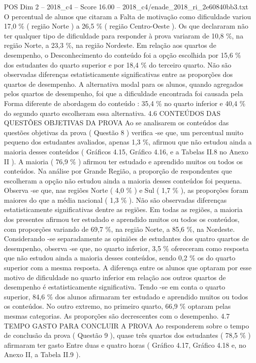 \begin{textsample}{POS Dim 2 – 2018\_c4 – Score 16.00 – 2018\_c4/enade\_2018\_ri\_2e60840bb3.txt}
O percentual de alunos que citaram a Falta de motivação como dificuldade variou 17,0 \% ( região Norte ) a 26,5 \% ( região Centro-Oeste ).
Os que declararam não ter qualquer tipo de dificuldade para responder à prova variaram de 10,8 \%, na região Norte, a 23,3 \%, na região Nordeste.
Em relação aos quartos de desempenho, o Desconhecimento do conteúdo foi a opção escolhida por 15,6 \% dos estudantes do quarto superior e por 18,4 \% do terceiro quarto.
Não são observadas diferenças estatisticamente significativas entre as proporções dos quartos de desempenho.
A alternativa modal para os alunos, quando agregados pelos quartos de desempenho, foi que a dificuldade encontrada foi causada pela Forma diferente de abordagem do conteúdo : 35,4 \% no quarto inferior e 40,4 \% do segundo quarto escolheram essa alternativa. 4.6 CONTEÚDOS DAS QUESTÕES OBJETIVAS DA PROVA Ao se analisarem os conteúdos das questões objetivas da prova ( Questão 8 ) verifica -se que, um percentual muito pequeno dos estudantes avaliados, apenas 1,3 \%, afirmou que não estudou ainda a maioria desses conteúdos ( Gráficos 4.15, Gráfico 4.16, e a Tabelas II.8 no Anexo II ).
A maioria ( 76,9 \% ) afirmou ter estudado e aprendido muitos ou todos os conteúdos.
Na análise por Grande Região, a proporção de respondentes que escolheram a opção não estudou ainda a maioria desses conteúdos foi pequena.
Observa -se que, nas regiões Norte ( 4,0 \% ) e Sul ( 1,7 \% ), as proporções foram maiores do que a média nacional ( 1,3 \% ).
Não são observadas diferenças estatisticamente significativas dentre as regiões.
Em todas as regiões, a maioria dos presentes afirmou ter estudado e aprendido muitos ou todos os conteúdos, com proporções variando de 69,7 \%, na região Norte, a 85,6 \%, na Nordeste.
Considerando -se separadamente as opiniões de estudantes dos quatro quartos de desempenho, observa -se que, no quarto inferior, 3,5 \% ofereceram como resposta que não estudou ainda a maioria desses conteúdos, sendo 0,2 \% os do quarto superior com a mesma resposta.
A diferença entre os alunos que optaram por esse motivo de dificuldade no quarto inferior em relação aos outros quartos de desempenho é estatisticamente significativa.
Tendo -se em conta o quarto superior, 84,6 \% dos alunos afirmaram ter estudado e aprendido muitos ou todos os conteúdos.
No outro extremo, no primeiro quarto, 66,9 \% optaram pelas mesmas categorias.
As proporções são decrescentes com o desempenho. 4.7 TEMPO GASTO PARA CONCLUIR A PROVA Ao responderem sobre o tempo de conclusão da prova ( Questão 9 ), quase três quartos dos estudantes ( 78,5 \% ) afirmaram ter gasto Entre duas e quatro horas ( Gráfico 4.17, Gráfico 4.18 e, no Anexo II, a Tabela II.9 ).

\end{textsample}

